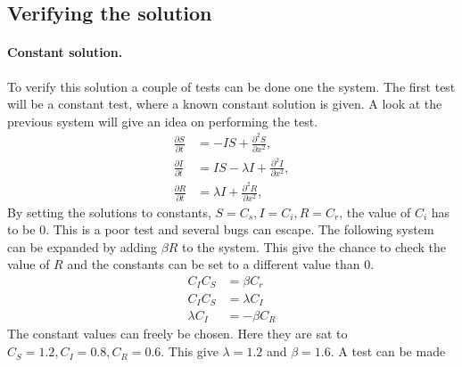 \documentclass[%
twoside,                 %
final,                   %
10pt]{article}
\begin{document}
\subsection{Verifying the solution}
\paragraph{Constant solution.}
To verify this solution a couple of tests can be done one the system. The first test will be a constant test, where a known constant solution is given. A look at the previous system will give an idea on performing the test.
\begin{equation} \label{eq:simple_non_PDE2}
	\begin{aligned}
	\frac{\partial S}{\partial t} &= -IS + \frac{\partial^2 S}{\partial x^2},\\
	\frac{\partial I}{\partial t} &= IS- \lambda I + \frac{\partial^2 I}{\partial x^2},\\
	\frac{\partial R}{\partial t} &= \lambda I + \frac{\partial^2 R}{\partial x^2},
	\end{aligned}
\end{equation}
By setting the solutions to constants, $S = C_s,I=C_i,R=C_r$, the value of $C_i$ has to be 0. This is a poor test and several bugs can escape. The following system can be expanded by adding $\beta R$ to the system. This give the chance to check the value of $R$ and the constants can be set to a different value than 0.  
\begin{equation} \label{eq:constant_PDE}
	\begin{aligned}
	C_IC_S &= \beta C_r \\
	C_IC_S &= \lambda C_I \\
	\lambda C_I &= -\beta C_R 
	\end{aligned}
\end{equation}
The constant values can freely be chosen. Here they are sat to $C_S = 1.2,C_I=0.8,C_R=0.6$. This give $\lambda=1.2$ and $\beta=1.6$. A test can be made
\end{document}
